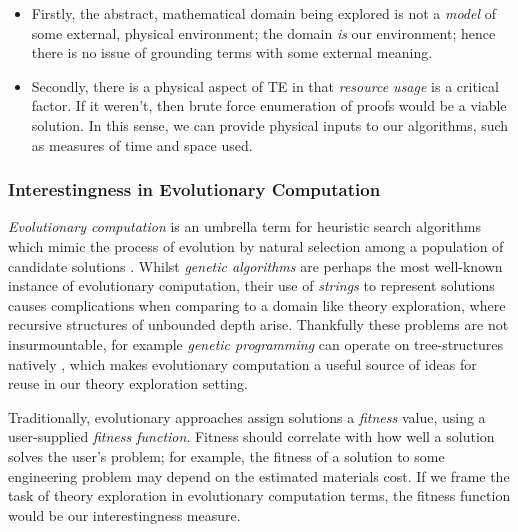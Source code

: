 \begin{itemize}

  \item Firstly, the abstract, mathematical domain being explored is not a \emph{model} of some external, physical environment; the domain \emph{is} our environment; hence there is no issue of grounding terms with some external meaning.

  \item Secondly, there is a physical aspect of TE in that \emph{resource usage} is a critical factor. If it weren't, then brute force enumeration of proofs would be a viable solution. In this sense, we can provide physical inputs to our algorithms, such as measures of time and space used.

\end{itemize}

\iffalse

\subsubsection{Universal Drives}

PhysRevLett.110.168702.pdf
Omohundro? Too physical.
\emph{Universal drives} are those

\fi

\subsubsection{Interestingness in Evolutionary Computation}

\emph{Evolutionary computation} is an umbrella term for heuristic search algorithms which mimic the process of evolution by natural selection among a population of candidate solutions \citep{back1997evolutionary}. Whilst \emph{genetic algorithms} are perhaps the most well-known instance of evolutionary computation, their use of \emph{strings} to represent solutions causes complications when comparing to a domain like theory exploration, where recursive structures of unbounded depth arise. Thankfully these problems are not insurmountable, for example \emph{genetic programming} can operate on tree-structures natively \citep{banzhaf1998genetic}, which makes evolutionary computation a useful source of ideas for reuse in our theory exploration setting.

Traditionally, evolutionary approaches assign solutions a \emph{fitness} value, using a user-supplied \emph{fitness function}. Fitness should correlate with how well a solution solves the user's problem; for example, the fitness of a solution to some engineering problem may depend on the estimated materials cost. If we frame the task of theory exploration in evolutionary computation terms, the fitness function would be our interestingness measure.

